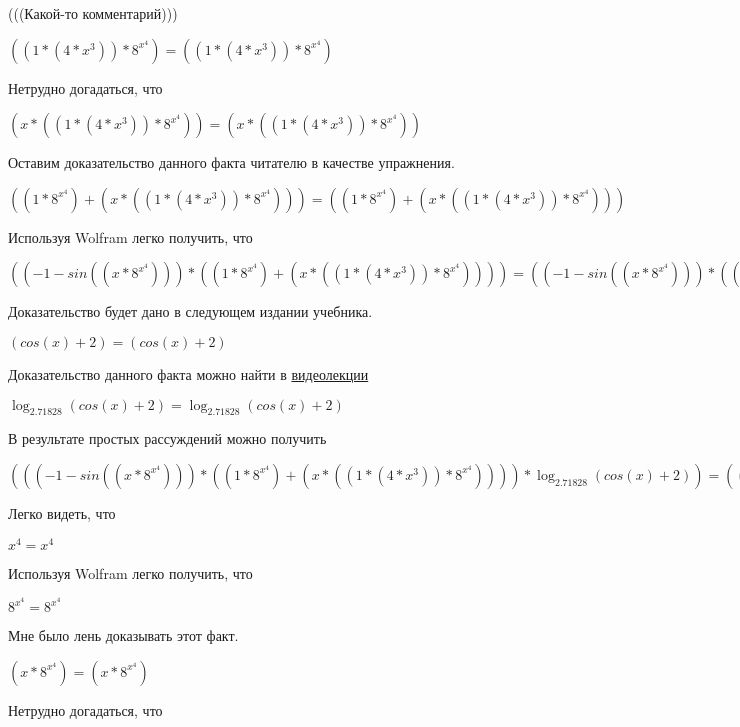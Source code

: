 \documentclass[12pt,a4paper,fleqn]{article}
\theoremstyle{definition}
\begin{document}
(((Какой-то комментарий)))

$(( 1  * ( 4  * { x }^{ 3 })) * { 8 }^{{ x }^{ 4 }}) = (( 1  * ( 4  * { x }^{ 3 })) * { 8 }^{{ x }^{ 4 }})$

Нетрудно догадаться, что

$( x  * (( 1  * ( 4  * { x }^{ 3 })) * { 8 }^{{ x }^{ 4 }})) = ( x  * (( 1  * ( 4  * { x }^{ 3 })) * { 8 }^{{ x }^{ 4 }}))$

Оставим доказательство данного факта читателю в качестве упражнения.

$(( 1  * { 8 }^{{ x }^{ 4 }}) + ( x  * (( 1  * ( 4  * { x }^{ 3 })) * { 8 }^{{ x }^{ 4 }}))) = (( 1  * { 8 }^{{ x }^{ 4 }}) + ( x  * (( 1  * ( 4  * { x }^{ 3 })) * { 8 }^{{ x }^{ 4 }})))$

Используя Wolfram легко получить, что

$(( -1  - sin(( x  * { 8 }^{{ x }^{ 4 }}))) * (( 1  * { 8 }^{{ x }^{ 4 }}) + ( x  * (( 1  * ( 4  * { x }^{ 3 })) * { 8 }^{{ x }^{ 4 }})))) = (( -1  - sin(( x  * { 8 }^{{ x }^{ 4 }}))) * (( 1  * { 8 }^{{ x }^{ 4 }}) + ( x  * (( 1  * ( 4  * { x }^{ 3 })) * { 8 }^{{ x }^{ 4 }}))))$

Доказательство будет дано в следующем издании учебника.

$(cos( x ) +  2 ) = (cos( x ) +  2 )$

Доказательство данного факта можно найти в \href{https://www.youtube.com/watch?v=dQw4w9WgXcQ}{видеолекции}

$\log_{ 2.71828 }{(cos( x ) +  2 )} = \log_{ 2.71828 }{(cos( x ) +  2 )}$

В результате простых рассуждений можно получить

$((( -1  - sin(( x  * { 8 }^{{ x }^{ 4 }}))) * (( 1  * { 8 }^{{ x }^{ 4 }}) + ( x  * (( 1  * ( 4  * { x }^{ 3 })) * { 8 }^{{ x }^{ 4 }})))) * \log_{ 2.71828 }{(cos( x ) +  2 )}) = ((( -1  - sin(( x  * { 8 }^{{ x }^{ 4 }}))) * (( 1  * { 8 }^{{ x }^{ 4 }}) + ( x  * (( 1  * ( 4  * { x }^{ 3 })) * { 8 }^{{ x }^{ 4 }})))) * \log_{ 2.71828 }{(cos( x ) +  2 )})$

Легко видеть, что

${ x }^{ 4 } = { x }^{ 4 }$

Используя Wolfram легко получить, что

${ 8 }^{{ x }^{ 4 }} = { 8 }^{{ x }^{ 4 }}$

Мне было лень доказывать этот факт.

$( x  * { 8 }^{{ x }^{ 4 }}) = ( x  * { 8 }^{{ x }^{ 4 }})$

Нетрудно догадаться, что
\end{document}
